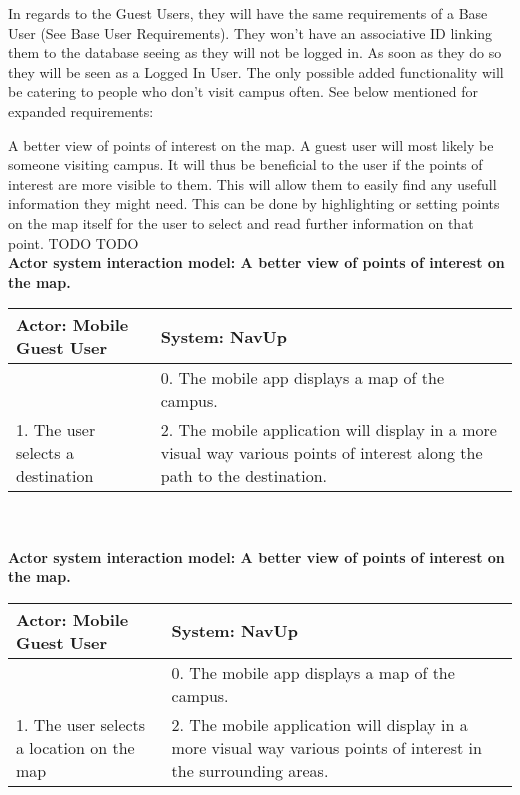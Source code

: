 In regards to the Guest Users, they will have the same requirements of a Base User (See Base User Requirements). They won't have an associative ID linking them to the database seeing as they will not be logged in. As soon as they do so they will be seen as a Logged In User. The only possible added functionality will be catering to people who don't visit campus often. See below mentioned for expanded requirements:

\FuncReq
{A better view of points of interest on the map.}
{A guest user will most likely be someone visiting campus. It will thus be beneficial to the user if the points of interest are more visible to them. This will allow them to easily find any usefull information they might need. This can be done by highlighting or setting points on the map itself for the user to select and read further information on that point.}
{TODO}
{TODO}
\\
\textbf{Actor system interaction model: A better view of points of interest on the map.}\\
\begin{tabular}{ | p{6cm} | p{6cm} |}
\hline
Actor: Mobile Guest User & System: NavUp \\ \hline
& 0. The mobile app displays a map of the campus.\\ \hline
1. The user selects a destination & 2. The mobile application will display in a more visual way various points of interest along the path to the destination.\\ \hline
\end{tabular}
\\
\bigskip
\\    
\textbf{Actor system interaction model: A better view of points of interest on the map. }\\
\begin{tabular}{ | p{6cm} | p{6cm} |}
\hline
Actor: Mobile Guest User & System: NavUp \\ \hline
& 0. The mobile app displays a map of the campus.\\ \hline
1. The user selects a location on the map & 2. The mobile application will display in a more visual way various points of interest in the surrounding areas.\\ \hline
\end{tabular}
\\
\bigskip

